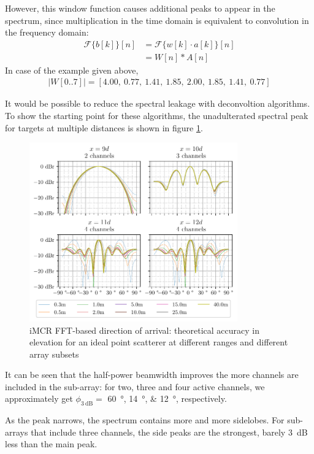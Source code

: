 However, this window function causes additional peaks to appear in the spectrum,
since multiplication in the time domain is equivalent to convolution in the frequency domain:
\begin{align*}
    \mathcal{F}\{b[k]\}[n] & = \mathcal{F}\{w[k] \cdot  a[k]   \}[n] \\
                           & = W[n] * A[n]
\end{align*}
In case of the example given above,
\begin{align*}
    |W[0..7]| = [4.00,\ 0.77,\ 1.41,\ 1.85,\ 2.00,\ 1.85,\ 1.41,\ 0.77]
\end{align*}

It would be possible to reduce the spectral leakage with deconvoltion algorithms.
To show the starting point for these algorithms,
the unadulterated spectral peak for targets at multiple distances is shown in figure \ref{fig:fft_elv_peak}.

\begin{figure}[h]
    \centering
    \includegraphics[width=0.8\textwidth]{../figures/fft_elv_peak.pdf}
    \caption{iMCR FFT-based direction of arrival: theoretical accuracy in elevation for an ideal point scatterer at different ranges and different array subsets}
    \label{fig:fft_elv_peak}
\end{figure}

It can be seen that the half-power beamwidth improves the more channels are included in the sub-array:
for two, three and four active channels, we approximately get
$\phi_{\SI{3}{\dB}}=$ \SIlist{60;14;12}{\degree}, respectively.

As the peak narrows, the spectrum contains more and more sidelobes.
For sub-arrays that include three channels, the side peaks are the strongest,
barely \SI{3}{\dB} less than the main peak. \\

